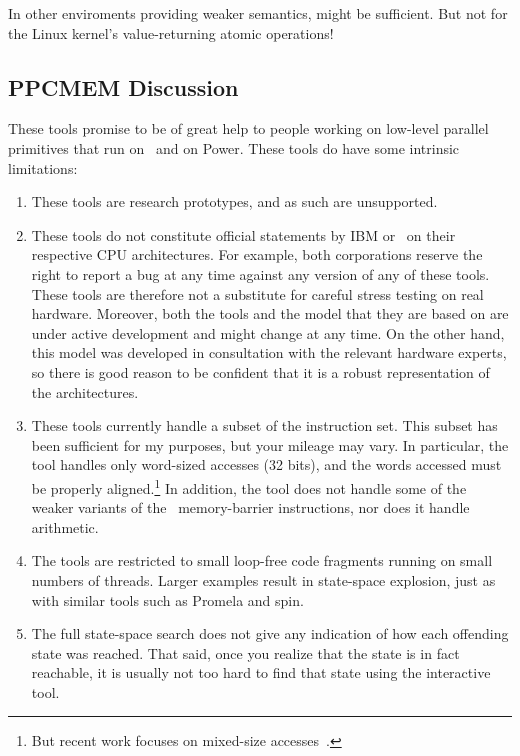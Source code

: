 \begin{fcvref}
{{	In other enviroments providing weaker semantics, 
	might be sufficient.
	But not for the Linux kernel's value-returning atomic operations!
}\QuickQuizEndE
}

\subsection{PPCMEM Discussion}
\label{sec:formal:PPCMEM Discussion}

These tools promise to be of great help to people working on low-level
parallel primitives that run on \ARM\ and on Power. These tools do have
some intrinsic limitations:

\begin{enumerate}
\item	These tools are research prototypes, and as such are unsupported.
\item	These tools do not constitute official statements by IBM or \ARM\
	on their respective CPU architectures. For example, both
	corporations reserve the right to report a bug at any time against
	any version of any of these tools. These tools are therefore not a
	substitute for careful stress testing on real hardware. Moreover,
	both the tools and the model that they are based on are under
	active development and might change at any time. On the other
	hand, this model was developed in consultation with the relevant
	hardware experts, so there is good reason to be confident that
	it is a robust representation of the architectures.
\item	These tools currently handle a subset of the instruction set.
	This subset has been sufficient for my purposes, but your mileage
	may vary. In particular, the tool handles only word-sized accesses
	(32 bits), and the words accessed must be properly aligned.\footnote{
		But recent work focuses on mixed-size
		accesses~\cite{Flur:2017:MCA:3093333.3009839}.}
	In addition, the tool does not handle some of the weaker variants
	of the \ARM\ memory-barrier instructions, nor does it handle
	arithmetic.
\item	The tools are restricted to small loop-free code fragments
	running on small numbers of threads. Larger examples result
	in state-space explosion, just as with similar tools such as
	Promela and spin.
\item	The full state-space search does not give any indication of how
	each offending state was reached. That said, once you realize
	that the state is in fact reachable, it is usually not too hard
	to find that state using the interactive tool.

\end{enumerate}
\end{fcvref}

